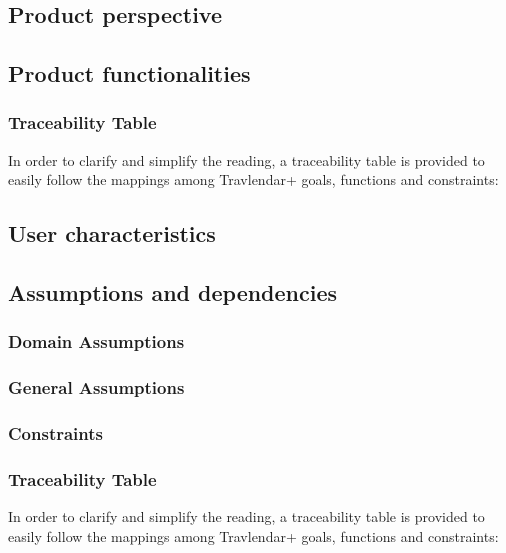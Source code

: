 \documentclass{article}
\begin{document}
\subsection{Product perspective}



\clearpage

\subsection{Product functionalities}

\subsubsection{Traceability Table}
In order to clarify and simplify the reading, a traceability table is provided to easily follow the mappings among Travlendar+ goals, functions and constraints: \\

\clearpage

\subsection{User characteristics}



\subsection{Assumptions and dependencies}

\subsubsection{Domain Assumptions}


\subsubsection{General Assumptions}


\subsubsection{Constraints}

\subsubsection{Traceability Table}
In order to clarify and simplify the reading, a traceability table is provided to easily follow the mappings among Travlendar+ goals, functions and constraints: \\

\end{document}

